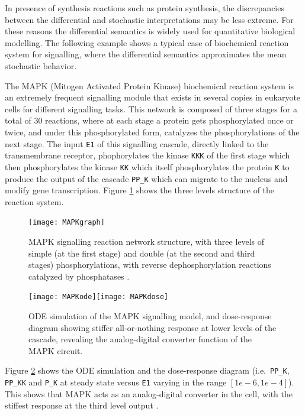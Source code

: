\documentclass[graybox]{svmult}
\begin{document}
In presence of synthesis reactions such as protein synthesis,
the discrepancies between the differential and stochastic interpretations may be less extreme.
For these reasons the differential semantics is widely used for quantitative biological modelling.
The following example shows a typical case of biochemical reaction system for signalling, where the differential semantics approximates the mean stochastic behavior.

\begin{example}\label{MAPK}
  The MAPK (Mitogen Activated Protein Kinase) biochemical reaction system is an extremely frequent signalling module
  that exists in several copies in eukaryote cells for different signalling tasks.
  This network is composed of three stages for a total of 30 reactions, where at each stage a protein gets phosphorylated once or twice, and under this phosphorylated form,
  catalyzes the phosphorylations of the next stage. The input {\small\verb|E1|} of this signalling cascade, directly linked to the transmembrane receptor,
  phophorylates the kinase {\small\verb|KKK|} of the first stage which then phosphorylates the kinase {\small\verb|KK|} which itself phosphorylates the protein {\small\verb|K|}
  to produce the output of the cascade {\small\verb|PP_K|} which can migrate to the nucleus and modify gene transcription.
  Figure \ref{MAPKfig} shows the three levels structure of the reaction system.

\begin{figure}[htb]
\begin{center}
\texttt{[image: MAPKgraph]} %
\end{center}
  \caption{MAPK signalling reaction network structure, with three levels of simple (at the first stage) and double (at the second and third stages) phosphorylations, with reverse dephosphorylation reactions catalyzed by phosphatases \cite{HF96pnas}.}\label{MAPKfig}
\end{figure}
\begin{figure}[htb]
\begin{center}
\texttt{[image: MAPKode]}\texttt{[image: MAPKdose]}
\end{center}
\caption{ODE simulation of the MAPK signalling model, and dose-response diagram showing stiffer all-or-nothing response at lower levels of the cascade,
  revealing the analog-digital converter function of the MAPK circuit.}\label{MAPKode}
\end{figure}

  Figure \ref{MAPKode} shows the ODE simulation
  and the dose-response diagram (i.e.~{\small\verb|PP_K|}, {\small\verb|PP_KK|} and {\small\verb|P_K|} at steady state versus \verb|E1| varying in the range $[1e-6,1e-4]$).
    This shows that MAPK acts as an analog-digital converter in the cell, with the stiffest response at the third level output \cite{HF96pnas}.
    
\end{example}
\end{document}
